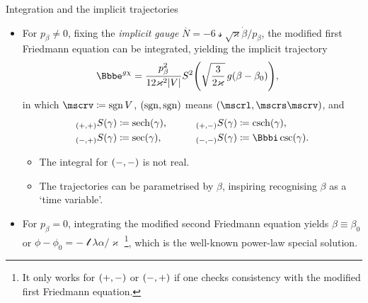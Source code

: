 \documentclass[8pt]{beamer}
\begin{document}
\begin{frame}%
{Integration and the implicit trajectories}%
\begin{itemize}


\item For $p_\beta \neq 0$, fixing the \emph{implicit gauge}
$\overline{N} = -6\mscrs\sqrt{\varkappa}\dot{\beta}/p_\beta$, the modified
first Friedmann equation can be integrated, yielding the \alert{implicit}
trajectory
\begin{align}
\ee^{g\chi} &=
\frac{p_\beta^2}{12\varkappa^2\vbr{V}}
\rfun{S^2}{ \sqrt{\frac{3}{2\varkappa}}\,g \rbr{\beta-\beta_0}},
\end{align}
in which $\mscrv \coloneqq \sgn V$, ${\left(\mathrm{sgn},\mathrm{sgn}\right)}$ means 
$\rbr{\mscrl,\mscrs\mscrv}$, and
\begin{align}
\begin{aligned}
\rfun{{}_{\rbr{+,+}}S}{\gamma} &\coloneqq \rfun{\sech}{\gamma},
&\qquad
\rfun{{}_{\rbr{+,-}}S}{\gamma} &\coloneqq \rfun{\csch}{\gamma},\\
\rfun{{}_{\rbr{-,+}}S}{\gamma} &\coloneqq \rfun{\sec}{\gamma},
&\qquad
\rfun{{}_{\rbr{-,-}}S}{\gamma} &\coloneqq \rfun{\ii\csc}{\gamma}.\\
\end{aligned}
\end{align}
\begin{itemize}
\item The integral for ${\left(-,-\right)}$ is not real.
\item The trajectories can be parametrised by $\beta$, inspiring recognising
$\beta$ as a `time variable'.
\end{itemize}

\item For $p_\beta = 0$, integrating the modified second Friedmann 
equation yields $\beta \equiv \beta_0$ or $\phi-\phi_0 =
-\mscrl\lambda\alpha/\varkappa$%
\footnote{It only works for ${\left(+,-\right)}$ or ${\left(-,+\right)}$ if one checks consistency
with the modified first Friedmann equation.}, which is the well-known power-law
special solution.


\end{itemize}
\end{frame}
\end{document}
